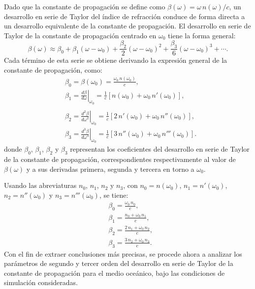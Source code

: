 Dado que la constante de propagación se define como $\beta(\omega) = \omega\,n(\omega)/c$, un desarrollo en serie de Taylor del índice de refracción conduce de forma directa a un desarrollo equivalente de la constante de propagación. El desarrollo en serie de Taylor de la constante de propagación centrado en $\omega_0$ tiene la forma general:
\begin{equation}
\beta(\omega)\approx\beta_0+\beta_1(\omega-\omega_0)+\frac{\beta_2}{2}(\omega-\omega_0)^2+\frac{\beta_3}{6}(\omega-\omega_0)^3+\cdots .
\label{eq:taylor_beta_agua}
\end{equation}
Cada término de esta serie se obtiene derivando la expresión general de la constante de propagación, como:
\begin{equation}
\begin{split}
&\beta_0 = \beta(\omega_0) = \frac{\omega_0\,n(\omega_0)}{c},\\
&\beta_1 = \left. \frac{d\beta}{d\omega} \right|_{\omega_0}
         = \frac{1}{c}\left[ n(\omega_0) + \omega_0\,n'(\omega_0) \right], \\ \\
&\beta_2 = \left. \frac{d^2 \beta}{d\omega^2} \right|_{\omega_0}
         = \frac{1}{c}\left[ 2\,n'(\omega_0) + \omega_0\,n''(\omega_0) \right],\\
&\beta_3 = \left. \frac{d^3 \beta}{d\omega^3} \right|_{\omega_0}
         = \frac{1}{c}\left[ 3\,n''(\omega_0) + \omega_0\,n'''(\omega_0) \right].
\label{eq:beta3}
\end{split}
\end{equation}
donde $\beta_0$, $\beta_1$, $\beta_2$ y $\beta_3$ representan los coeficientes del desarrollo en serie de Taylor de la constante de propagación, correspondientes respectivamente al valor de $\beta(\omega)$ y a sus derivadas primera, segunda y tercera en torno a $\omega_0$.

Usando las abreviaturas $n_0$, $n_1$, $n_2$ y $n_3$, con $n_0 = n(\omega_0)$, $n_1 = n'(\omega_0)$, $n_2 = n''(\omega_0)$ y $n_3 = n'''(\omega_0)$, se tiene:
\begin{equation}
\begin{split}
&\beta_0 = \frac{\omega_0\,n_0}{c},\\
&\beta_1 = \frac{n_0 + \omega_0\,n_1}{c},\\ 
&\beta_2 = \frac{2\,n_1 + \omega_0\,n_2}{c},\\
&\beta_3 = \frac{3\,n_2 + \omega_0\,n_3}{c}.
\end{split}
\end{equation}
Con el fin de extraer conclusiones más precisas, se procede ahora a analizar los parámetros de segundo y tercer orden del desarrollo en serie de Taylor de la constante de propagación para el medio oceánico, bajo las condiciones de simulación consideradas.

